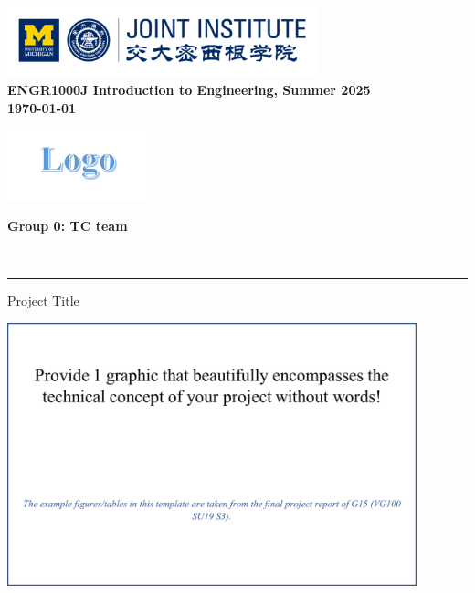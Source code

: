 \documentclass{engr1000j-s2}
\begin{document}
  \thispagestyle{firstpage}
  \includegraphics[height=0.8in]{figures/headlogo.png}
  \\ \textbf{\Large ENGR1000J Introduction to Engineering, Summer 2025}\\[0.5em]
  \textbf{{\Large \today}}\\[0em]

  \begin{center}

    \begin{minipage}{0.45\textwidth}
      \includegraphics[height=0.8in]{figures/team logo.png}
    \end{minipage}\hfill
    \begin{minipage}{0.45\textwidth}
      \textbf{\Large Group 0: TC team}
    \end{minipage}\\[0.2em]
  \end{center}

  \noindent
  {\color{gray!30}\rule{\textwidth}{0.1pt}}

  {\Huge Project Title}

  {\includegraphics[height=3in]{figures/preface_picture.png}}

  \hspace{1em}
\end{document}

